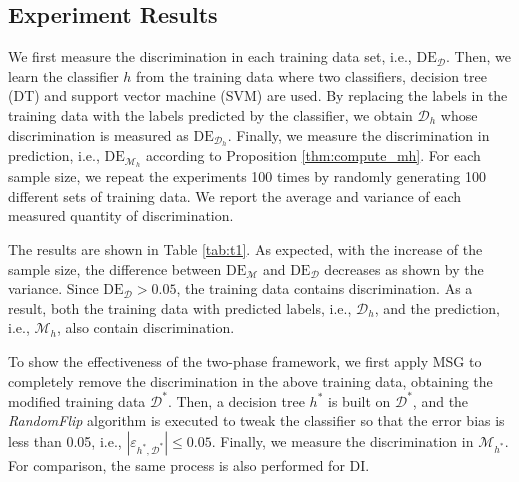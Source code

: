 \documentclass{article}
\begin{document}
\subsection{Experiment Results}
We first measure the discrimination in each training data set, i.e., $\mathrm{DE}_{\mathcal{D}}$. Then, we learn the classifier $h$ from the training data where two classifiers, decision tree (DT) and support vector machine (SVM) are used. By replacing the labels in the training data with the labels predicted by the classifier, we obtain $\mathcal{D}_{h}$ whose discrimination is measured as $\mathrm{DE}_{\mathcal{D}_{h}}$. Finally, we measure the discrimination in prediction, i.e., $\mathrm{DE}_{\mathcal{M}_{h}}$ according to Proposition \ref{thm:compute_mh}. For each sample size, we repeat the experiments 100 times by randomly generating 100 different sets of training data. We report the average and variance of each measured quantity of discrimination.

The results are shown in Table \ref{tab:t1}. As expected, with the increase of the sample size, the difference between $\mathrm{DE}_{\mathcal{M}}$ and $\mathrm{DE}_{\mathcal{D}}$ decreases as shown by the variance. Since $\mathrm{DE}_{\mathcal{D}}>0.05$, the training data contains discrimination. As a result, both the training data with predicted labels, i.e., $\mathcal{D}_{h}$, and the prediction, i.e., $\mathcal{M}_{h}$, also contain discrimination.

To show the effectiveness of the two-phase framework, we first apply MSG to completely remove the discrimination in the above training data, obtaining the modified training data $\mathcal{D}^{*}$. Then, a decision tree $h^{*}$ is built on $\mathcal{D}^{*}$, and the \emph{RandomFlip} algorithm is executed to tweak the classifier so that the error bias is less than 0.05, i.e., $\left| \varepsilon_{h^{*},\mathcal{D}^{*}} \right| \leq 0.05$. Finally, we measure the discrimination in $\mathcal{M}_{h^{*}}$. For comparison, the same process is also performed for DI.

\end{document}
